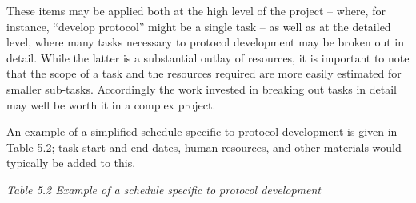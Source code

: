 \documentclass[]{book}
\theoremstyle{definition}
\theoremstyle{definition}
\theoremstyle{definition}
\theoremstyle{remark}
\begin{document}
These items may be applied both at the high level of the project --
where, for instance, ``develop protocol'' might be a single task -- as
well as at the detailed level, where many tasks necessary to protocol
development may be broken out in detail. While the latter is a
substantial outlay of resources, it is important to note that the scope
of a task and the resources required are more easily estimated for
smaller sub-tasks. Accordingly the work invested in breaking out tasks
in detail may well be worth it in a complex project.

An example of a simplified schedule specific to protocol development is
given in Table 5.2; task start and end dates, human resources, and other
materials would typically be added to this.

\emph{Table 5.2 Example of a schedule specific to protocol development}
\end{document}
